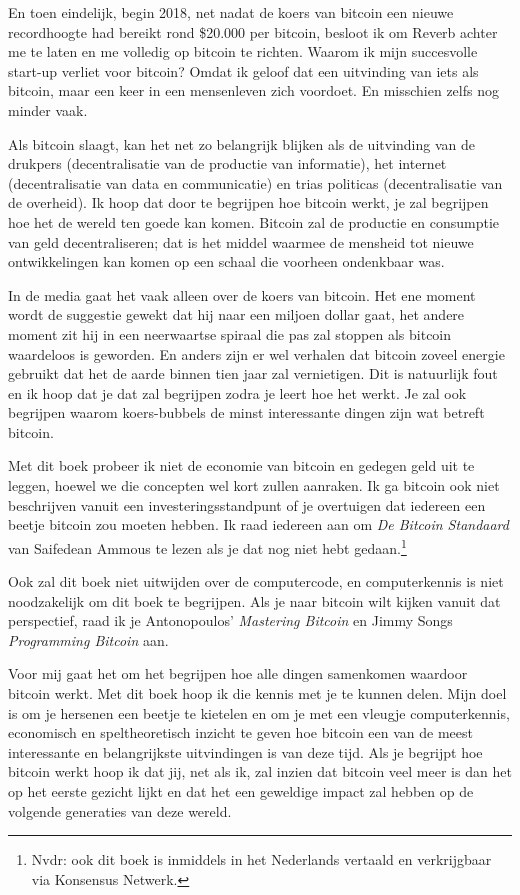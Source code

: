 \documentclass[
  letterpaper,
]{scrbook}
\begin{document}
En toen eindelijk, begin 2018, net nadat de koers van bitcoin een nieuwe
recordhoogte had bereikt rond \$20.000 per bitcoin, besloot ik om Reverb
achter me te laten en me volledig op bitcoin te richten. Waarom ik mijn
succesvolle start-up verliet voor bitcoin? Omdat ik geloof dat een
uitvinding van iets als bitcoin, maar een keer in een mensenleven zich
voordoet. En misschien zelfs nog minder vaak.

Als bitcoin slaagt, kan het net zo belangrijk blijken als de uitvinding
van de drukpers (decentralisatie van de productie van informatie), het
internet (decentralisatie van data en communicatie) en trias politicas
(decentralisatie van de overheid). Ik hoop dat door te begrijpen hoe
bitcoin werkt, je zal begrijpen hoe het de wereld ten goede kan komen.
Bitcoin zal de productie en consumptie van geld decentraliseren; dat is
het middel waarmee de mensheid tot nieuwe ontwikkelingen kan komen op
een schaal die voorheen ondenkbaar was.

In de media gaat het vaak alleen over de koers van bitcoin. Het ene
moment wordt de suggestie gewekt dat hij naar een miljoen dollar gaat,
het andere moment zit hij in een neerwaartse spiraal die pas zal stoppen
als bitcoin waardeloos is geworden. En anders zijn er wel verhalen dat
bitcoin zoveel energie gebruikt dat het de aarde binnen tien jaar zal
vernietigen. Dit is natuurlijk fout en ik hoop dat je dat zal begrijpen
zodra je leert hoe het werkt. Je zal ook begrijpen waarom koers-bubbels
de minst interessante dingen zijn wat betreft bitcoin.

Met dit boek probeer ik niet de economie van bitcoin en gedegen geld uit
te leggen, hoewel we die concepten wel kort zullen aanraken. Ik ga
bitcoin ook niet beschrijven vanuit een investeringsstandpunt of je
overtuigen dat iedereen een beetje bitcoin zou moeten hebben. Ik raad
iedereen aan om \emph{De Bitcoin Standaard} van Saifedean Ammous te
lezen als je dat nog niet hebt gedaan.\footnote{Nvdr: ook dit boek is
  inmiddels in het Nederlands vertaald en verkrijgbaar via Konsensus
  Netwerk.}

Ook zal dit boek niet uitwijden over de computercode, en computerkennis
is niet noodzakelijk om dit boek te begrijpen. Als je naar bitcoin wilt
kijken vanuit dat perspectief, raad ik je Antonopoulos' \emph{Mastering
Bitcoin} en Jimmy Songs \emph{Programming Bitcoin} aan.

Voor mij gaat het om het begrijpen hoe alle dingen samenkomen waardoor
bitcoin werkt. Met dit boek hoop ik die kennis met je te kunnen delen.
Mijn doel is om je hersenen een beetje te kietelen en om je met een
vleugje computerkennis, economisch en speltheoretisch inzicht te geven
hoe bitcoin een van de meest interessante en belangrijkste uitvindingen
is van deze tijd. Als je begrijpt hoe bitcoin werkt hoop ik dat jij, net
als ik, zal inzien dat bitcoin veel meer is dan het op het eerste
gezicht lijkt en dat het een geweldige impact zal hebben op de volgende
generaties van deze wereld.
\end{document}
